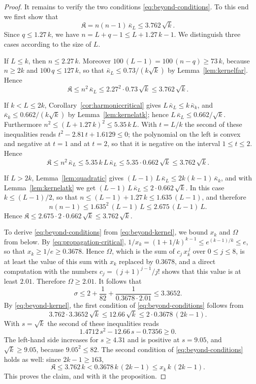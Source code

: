 \documentclass{amsart}
\theoremstyle{definition}
\theoremstyle{remark}
\numberwithin{equation}{section}
\begin{document}
\begin{proof}
It remains to verify the two conditions \eqref{eq:beyond-conditions}. To
this end we first show that
\begin{equation}\label{eq:beyond-kernel}
\mathfrak K=n(n-1)\,\bar\kappa_L\le3.762\,\sqrt k .
\end{equation}
Since $q\le1.27\,k$, we have $n=L+q-1\le L+1.27\,k-1$. We distinguish three
cases according to the size of $L$.

If $L\le k$, then $n\le2.27\,k$. Moreover
$100\,(L-1)=100\,(n-q)\ge73\,k$, because $n\ge2k$ and $100\,q\le127\,k$, so
that $\bar\kappa_L\le0.73/(k\sqrt k)$ by Lemma~\ref{lem:kernelfar}. Hence
\[
\mathfrak K\le n^2\,\bar\kappa_L\le2.27^2\cdot0.73\,\sqrt k\le3.762\,\sqrt k .
\]

If $k<L\le2k$, Corollary~\ref{cor:harmoniccritical} gives
$L\,\bar\kappa_L\le k\,\bar\kappa_k$, and
$\bar\kappa_k\le0.662/(k\sqrt k)$ by Lemma~\ref{lem:kernelatk}; hence
$L\,\bar\kappa_L\le0.662/\sqrt k$. Furthermore
$n^2\le(L+1.27\,k)^2\le5.35\,k\,L$. With $t=L/k$ the second of these
inequalities reads $t^2-2.81\,t+1.6129\le0$; the polynomial on the left is
convex and negative at $t=1$ and at $t=2$, so that it is negative on the
interval $1\le t\le2$. Hence
\[
\mathfrak K\le n^2\,\bar\kappa_L\le5.35\,k\,L\,\bar\kappa_L
\le5.35\cdot0.662\,\sqrt k\le3.762\,\sqrt k .
\]

If $L>2k$, Lemma~\ref{lem:quadratic} gives
$(L-1)\,L\,\bar\kappa_L\le2k(k-1)\,\bar\kappa_k$, and with
Lemma~\ref{lem:kernelatk} we get
$(L-1)\,L\,\bar\kappa_L\le2\cdot0.662\,\sqrt k$. In this case
$k\le(L-1)/2$, so that $n\le(L-1)+1.27\,k\le1.635\,(L-1)$, and therefore
\[
n(n-1)\le1.635^2\,(L-1)\,L\le2.675\,(L-1)\,L .
\]
Hence $\mathfrak K\le2.675\cdot2\cdot0.662\,\sqrt k\le3.762\,\sqrt k$.

To derive \eqref{eq:beyond-conditions} from \eqref{eq:beyond-kernel}, we
bound $x_k$ and $\Omega$ from below. By \eqref{eq:propagation-critical},
$1/x_k=(1+1/k)^{k-1}\le e^{(k-1)/k}\le e$, so that $x_k\ge1/e\ge0.3678$.
Hence $\Omega$, which is the sum of $c_j\,x_k^{\,j}$ over
$0\le j\le8$, is at least the value of this sum with $x_k$ replaced by
$0.3678$, and a direct computation with the numbers $c_j=(j+1)^{j-1}/j!$
shows that this value is at least $2.01$. Therefore
$\Omega\ge2.01$. It follows that
\[
\sigma\le2+\frac{1}{82}+\frac{1}{0.3678\cdot2.01}\le3.3652 .
\]
By \eqref{eq:beyond-kernel}, the first condition of
\eqref{eq:beyond-conditions} follows from
\[
3.762\cdot3.3652\,\sqrt k\le12.66\,\sqrt k\le2\cdot0.3678\,(2k-1).
\]
With $s=\sqrt k$ the second of these inequalities reads
\[
1.4712\,s^2-12.66\,s-0.7356\ge0 .
\]
The left-hand side increases for $s\ge4.31$ and is positive at $s=9.05$,
and $\sqrt k\ge9.05$, because $9.05^2\le82$. The second
condition of \eqref{eq:beyond-conditions} holds as well: since
$2k-1\ge163$,
\[
\mathfrak K\le3.762\,k<0.3678\,k\,(2k-1)\le x_k\,k\,(2k-1).
\]
This proves the claim, and with it the proposition.
\end{proof}
\end{document}
